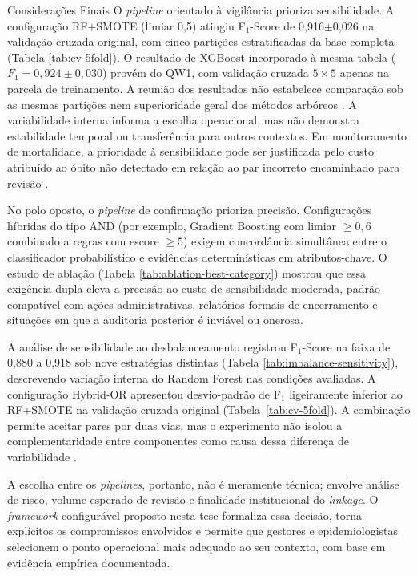 \begin{chapter}{Considerações Finais}
O \textit{pipeline} orientado à vigilância prioriza sensibilidade. A configuração RF+SMOTE (limiar 0,5) atingiu F$_1$-Score de 0,916$\pm$0,026 na validação cruzada original, com cinco partições estratificadas da base completa (Tabela \ref{tab:cv-5fold}). O resultado de XGBoost incorporado à mesma tabela ($F_1 = 0{,}924 \pm 0{,}030$) provém do QW1, com validação cruzada $5 \times 5$ apenas na parcela de treinamento. A reunião dos resultados não estabelece comparação sob as mesmas partições nem superioridade geral dos métodos arbóreos \cite{Breiman2001rf,Chen2016xgboost}. A variabilidade interna informa a escolha operacional, mas não demonstra estabilidade temporal ou transferência para outros contextos. Em monitoramento de mortalidade, a prioridade à sensibilidade pode ser justificada pelo custo atribuído ao óbito não detectado em relação ao par incorreto encaminhado para revisão \cite{Bartholomay2014improved}.

No polo oposto, o \textit{pipeline} de confirmação prioriza precisão. Configurações híbridas do tipo AND (por exemplo, Gradient Boosting com limiar $\geq 0,6$ combinado a regras com escore $\geq 5$) exigem concordância simultânea entre o classificador probabilístico e evidências determinísticas em atributos-chave. O estudo de ablação (Tabela \ref{tab:ablation-best-category}) mostrou que essa exigência dupla eleva a precisão ao custo de sensibilidade moderada, padrão compatível com ações administrativas, relatórios formais de encerramento e situações em que a auditoria posterior é inviável ou onerosa.

A análise de sensibilidade ao desbalanceamento registrou F$_1$-Score na faixa de 0,880 a 0,918 sob nove estratégias distintas (Tabela \ref{tab:imbalance-sensitivity}), descrevendo variação interna do Random Forest nas condições avaliadas. A configuração Hybrid-OR apresentou desvio-padrão de F$_1$ ligeiramente inferior ao RF+SMOTE na validação cruzada original (Tabela~\ref{tab:cv-5fold}). A combinação permite aceitar pares por duas vias, mas o experimento não isolou a complementaridade entre componentes como causa dessa diferença de variabilidade \cite{Doidge2018demystifying}.

A escolha entre os \textit{pipelines}, portanto, não é meramente técnica; envolve análise de risco, volume esperado de revisão e finalidade institucional do \textit{linkage}. O \textit{framework} configurável proposto nesta tese formaliza essa decisão, torna explícitos os compromissos envolvidos e permite que gestores e epidemiologistas selecionem o ponto operacional mais adequado ao seu contexto, com base em evidência empírica documentada.


\end{chapter}
